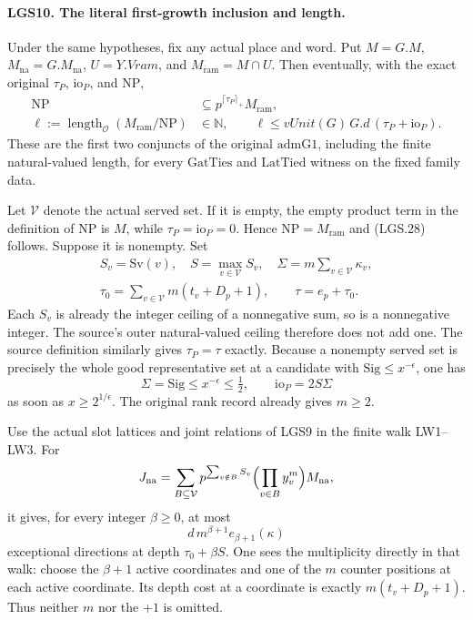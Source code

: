\documentclass[11pt,a4paper]{article}
\numberwithin{equation}{section}
\theoremstyle{remark}\newtheorem{remark}[theorem]{Remark}
\begin{document}
\paragraph{LGS10. The literal first-growth inclusion and length.}
\label{claim:LGS10}
Under the same hypotheses, fix any actual place and word.
Put \(M=G.M\), \(M_{\mathrm{na}}=G.M_{\mathrm{na}}\),
\(U=Y.Vram\), and \(M_{\mathrm{ram}}=M\cap U\).
Then eventually, with the exact original \(\tau_P\),
\(\mathrm{io}_P\), and \(\mathrm{NP}\),
\[
 \begin{split}
 \mathrm{NP}&\subseteq p^{\lceil\tau_P\rceil_+}M_{\mathrm{ram}},\\
 \ell:=\operatorname{length}_{\mathcal O}
                 (M_{\mathrm{ram}}/\mathrm{NP})&\in\mathbb N,
 \qquad
 \ell\le vUnit(G)\,G.d\,(\tau_P+\mathrm{io}_P).
 \end{split}                                                     \tag{LGS.28}
\]
These are the first two conjuncts of the original
\(\mathrm{admG1}\), including the finite natural-valued
length, for every \(\mathrm{GatTies}\) and
\(\mathrm{LatTied}\) witness on the fixed family data.

Let \(\mathcal V\) denote the actual served set.
If it is empty, the empty product term in the definition
of \(\mathrm{NP}\) is \(M\), while
\(\tau_P=\mathrm{io}_P=0\).  Hence
\(\mathrm{NP}=M_{\mathrm{ram}}\) and (LGS.28) follows.
Suppose it is nonempty.  Set
\[
 \begin{gathered}
 S_v=\mathrm{Sv}(v),\quad S=\max_{v\in\mathcal V}S_v,\quad
 \Sigma=m\sum_{v\in\mathcal V}\kappa_v,\\
 \tau_0=\sum_{v\in\mathcal V}m(t_v+D_p+1),\qquad
 \tau=e_p+\tau_0 .
 \end{gathered}                                                   \tag{LGS.29}
\]
Each \(S_v\) is already the integer ceiling of a
nonnegative sum, so is a nonnegative integer.
The source's outer natural-valued ceiling therefore
does not add one.  The source definition similarly
gives \(\tau_P=\tau\) exactly.
Because a nonempty served set is precisely the whole
good representative set at a candidate with
\(\mathrm{Sig}\le x^{-\epsilon}\), one has
\[
       \Sigma=\mathrm{Sig}\le x^{-\epsilon}\le\tfrac12,
       \qquad \mathrm{io}_P=2S\Sigma                  \tag{LGS.30}
\]
as soon as \(x\ge2^{1/\epsilon}\).
The original rank record already gives \(m\ge2\).

Use the actual slot lattices and joint relations of
LGS9 in the finite walk LW1--LW3.  For
\[
 J_{\mathrm{na}}=
 \sum_{B\subseteq\mathcal V}
     p^{\sum_{v\notin B}S_v}
       \Bigl(\prod_{v\in B}y_v^m\Bigr)M_{\mathrm{na}},
 \]
it gives, for every integer \(\beta\ge0\), at most
\[
               d\,m^{\beta+1}e_{\beta+1}(\kappa)       \tag{LGS.31}
\]
exceptional directions at depth \(\tau_0+\beta S\).
One sees the multiplicity directly in that walk:
choose the \(\beta+1\) active coordinates and one of
the \(m\) counter positions at each active coordinate.
Its depth cost at a coordinate is exactly
\(m(t_v+D_p+1)\).  Thus neither \(m\) nor the \(+1\)
is omitted.
\end{document}
